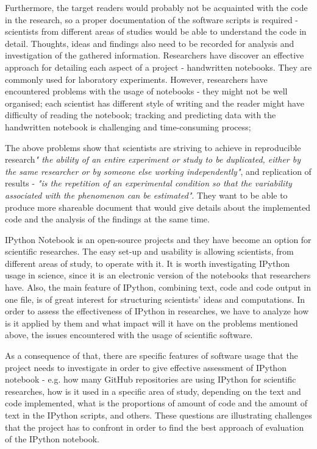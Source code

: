 Furthermore, the target readers would probably not be acquainted with the code in the research, so a proper documentation of the software scripts is required - scientists from different areas of studies would be able to understand the code in detail. Thoughts, ideas and findings also need to be recorded for analysis and investigation of the gathered information. Researchers have discover an effective approach for detailing each aspect of a project - handwritten notebooks.\cite{holmes2003reworking} They are commonly used for laboratory experiments. However, researchers have encountered problems with the usage of notebooks - they might not be well organised; each scientist has different style of writing and the reader might have difficulty of reading the notebook; tracking and predicting data with the handwritten notebook is challenging and time-consuming process;

The above problems show that scientists are striving to achieve in reproducible research\textit{" the ability of an entire experiment or study to be duplicated, either by the same researcher or by someone else working independently"}, and replication of results - \textit{"is the repetition of an experimental condition so that the variability associated with the phenomenon can be estimated"}. \cite{reproducibilityWiki} \cite{replicationWiki} They want to be able to produce more shareable document that would give details about the implemented code and the analysis of the findings at the same time. 

IPython Notebook is an open-source projects and they have become an option for scientific researches. The easy set-up and usability is allowing scientists, from different areas of study, to operate with it. It is worth investigating IPython usage in science, since it is an electronic version of the notebooks that researchers have. Also, the main feature of IPython, combining text, code and code output in one file, is of great interest for structuring scientists' ideas and computations. In order to assess the effectiveness of IPython in researches, we have to analyze how is it applied by them and what impact will it have on the problems mentioned above, the issues encountered with the usage of scientific software. 

As a consequence of that, there are specific features of software usage that the project needs to investigate in order to give effective assessment of IPython notebook - e.g. how many GitHub repositories are using IPython for scientific researches, how is it used in a specific area of study, depending on the text and code implemented, what is the proportions of amount of code and the amount of text in the IPython scripts, and others. These questions are illustrating challenges that the project has to confront in order to find the best approach of evaluation of the IPython notebook.  

